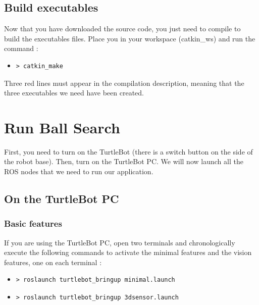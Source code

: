 \documentclass[10pt,a4paper]{article}
\begin{document}
\subsection{Build executables}

Now that you have downloaded the source code, you just need to compile to build the executables files. Place you in your workspace (catkin\_ws) and run the command : 

\begin{itemize}
\item[]  \begin{verbatim}> catkin_make \end{verbatim}
\end{itemize}

Three red lines must appear in the compilation description, meaning that the three executables we need have been created.

\newpage
\section{Run Ball Search}
\label{sec:Run Ball Search}

First, you need to turn on the TurtleBot (there is a switch button on the side of the robot base). Then, turn on the TurtleBot PC. We will now launch all the ROS nodes that we need to run our application.

\subsection{On the TurtleBot PC}

\subsubsection{Basic features}

If you are using the TurtleBot PC, open two terminals and chronologically execute the following commands to activate the minimal features and the vision features, one on each terminal :

\begin{itemize}
\item[]  \begin{verbatim}> roslaunch turtlebot_bringup minimal.launch \end{verbatim}
\item[]  \begin{verbatim}> roslaunch turtlebot_bringup 3dsensor.launch \end{verbatim}
\end{itemize}
\end{document}
